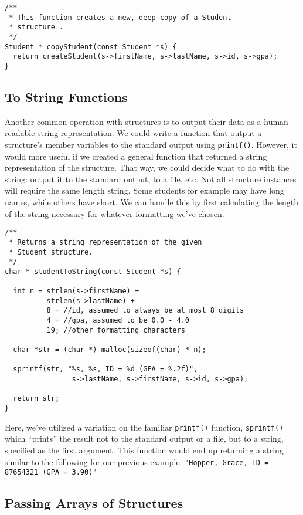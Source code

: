 \begin{verbatim}
/**
 * This function creates a new, deep copy of a Student 
 * structure .
 */
Student * copyStudent(const Student *s) {
  return createStudent(s->firstName, s->lastName, s->id, s->gpa);
}
\end{verbatim}

\subsection{To String Functions}

Another common operation with structures is to output their data
as a human-readable string representation.  We could write
a function that output a structure's member variables to the standard
output using \texttt{printf()}.  However, it would more 
useful if we created a general function that returned a 
string representation of the structure.  That way, we could decide
what to do with the string: output it to the standard output,
to a file, etc.  Not all structure instances will require the same 
length string.
Some students for example may have long names, while others have
short.  We can handle this by first calculating the length of 
the string necessary for whatever formatting we've chosen.

\begin{verbatim}
/**
 * Returns a string representation of the given 
 * Student structure.
 */
char * studentToString(const Student *s) {

  int n = strlen(s->firstName) + 
          strlen(s->lastName) + 
          8 + //id, assumed to always be at most 8 digits
          4 + //gpa, assumed to be 0.0 - 4.0
          19; //other formatting characters
          
  char *str = (char *) malloc(sizeof(char) * n);

  sprintf(str, "%s, %s, ID = %d (GPA = %.2f)", 
                s->lastName, s->firstName, s->id, s->gpa);

  return str;
}
\end{verbatim}

Here, we've utilized a variation on the familiar \texttt{printf()}
function, \texttt{sprintf()} which ``prints'' the result not
to the standard output or a file, but to a string, specified as
the first argument.  This function would end up returning a string 
similar to the following for our previous example: 
\texttt{"Hopper, Grace, ID = 87654321 (GPA = 3.90)"}

\subsection{Passing Arrays of Structures}

